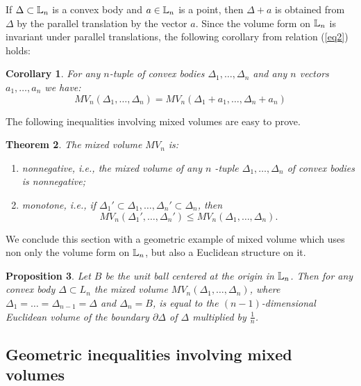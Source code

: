 \documentclass[11pt]{article}
\theoremstyle{plain}
\newtheorem{theorem}{Theorem}[section]
\newtheorem{proposition}[theorem]{Proposition}
\newtheorem{corollary}[theorem]{Corollary}
\theoremstyle{definition}
\begin{document}
If $\Delta\subset \Bbb L_n$ is a convex body and $a\in \Bbb L_n$ is a point, then $\Delta+a$ is obtained from $\Delta$ by the parallel translation by the vector $a$. Since the volume form on $\Bbb L_n$  is invariant under parallel translations, the following corollary   from relation (\ref{eq2}) holds:

\begin{corollary} For any $n$-tuple of convex bodies $\Delta_1,\dots, \Delta_n$ and any $n$ vectors $a_1,\dots, a_n$ we have:
\begin{equation*}MV_n(\Delta_1, \dots, \Delta_n)=MV_n (\Delta_1 +a_1,\dots, \Delta_n+a_n)\end{equation*}
\end{corollary}


The following inequalities involving mixed volumes  are easy to prove.

\begin{theorem} The mixed volume $MV_n$  is:
\begin{enumerate}

\item  nonnegative, i.e., the mixed volume of  any $n$ -tuple $\Delta_1,\dots,\Delta_n$ of convex bodies is nonnegative;
\item  monotone, i.e.,
if $\Delta_1'\subset \Delta_1, \dots, \Delta_n'\subset \Delta_n$, then
\begin{equation*} MV_n(\Delta_1',\dots,\Delta_n')\leq  MV_n(\Delta_1,\dots,\Delta_n).\end{equation*}
\end{enumerate}
\end{theorem}


 We conclude this section with a geometric  example  of mixed volume which uses non only the volume form on $\Bbb L_n$, but also a  Euclidean structure on it.

\begin{proposition}\label{B} Let  $B$ be the unit ball centered at the origin in $\Bbb L_n$. Then for any convex body $\Delta\subset L_n$ the mixed volume $MV_n(\Delta_1,\dots, \Delta_n)$, where $\Delta_1=\dots=\Delta_{n-1}=\Delta$ and $\Delta_n=B$, is equal to the $(n-1)$-dimensional Euclidean volume of the boundary $\partial \Delta$ of $\Delta$ multiplied by $\frac{1}{n}$.
\end{proposition}

\subsection{Geometric inequalities involving mixed volumes}
\end{document}
